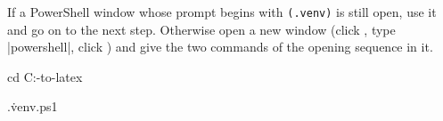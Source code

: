 If a PowerShell window whose prompt begins with \texttt{(.venv)} is still open, use it and go
on to the next step. Otherwise open a new window (click , type \code|powershell|,
click ) and give the two commands of the opening sequence in it.
\begin{ps}
cd C:\camera-to-latex
\end{ps}
\begin{ps}
.\.venv\Scripts\Activate.ps1
\end{ps}
\venvprompt
